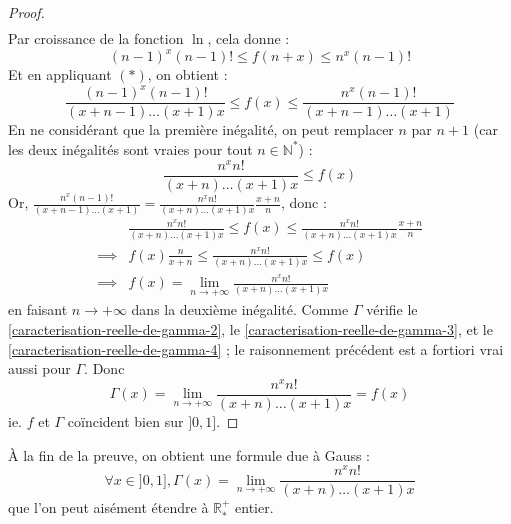 \begin{proof}
\begin{align*}
		\end{align*}
		Par croissance de la fonction $\ln$, cela donne :
		\[ (n-1)^x (n-1)! \leq f(n+x) \leq n^x (n-1)! \]
		Et en appliquant $(*)$, on obtient :
		\[ \frac{(n-1)^x (n-1)!}{(x+n-1) \dots (x+1)x} \leq f(x) \leq \frac{n^x (n-1)!}{(x+n-1) \dots (x+1)} \]
		En ne considérant que la première inégalité, on peut remplacer $n$ par $n+1$ (car les deux inégalités sont vraies pour tout $n \in \mathbb{N}^*$) :
		\[ \frac{n^x n!}{(x+n) \dots (x+1)x} \leq f(x) \]
		Or, $\frac{n^x (n-1)!}{(x+n-1) \dots (x+1)} = \frac{n^x n!}{(x+n) \dots (x+1)x} \frac{x+n}{n}$, donc :
		\begin{align*}
			&\frac{n^x n!}{(x+n) \dots (x+1)x} \leq f(x) \leq \frac{n^x n!}{(x+n) \dots (x+1)x} \frac{x+n}{n} \\
			\implies & f(x) \frac{n}{x+n} \leq \frac{n^x n!}{(x+n) \dots (x+1)x} \leq f(x) \\
			\implies & f(x) = \lim_{n \rightarrow +\infty} \frac{n^x n!}{(x+n) \dots (x+1)x}
		\end{align*}
		en faisant $n \longrightarrow +\infty$ dans la deuxième inégalité. Comme $\Gamma$ vérifie le \cref{caracterisation-reelle-de-gamma-2}, le \cref{caracterisation-reelle-de-gamma-3}, et le \cref{caracterisation-reelle-de-gamma-4} ; le raisonnement précédent est a fortiori vrai aussi pour $\Gamma$. Donc
		\[ \Gamma(x) = \lim_{n \rightarrow +\infty} \frac{n^x n!}{(x+n) \dots (x+1)x} = f(x)  \]
		ie. $f$ et $\Gamma$ coïncident bien sur $]0, 1]$.
	\end{proof}

	\begin{remark}
		À la fin de la preuve, on obtient une formule due à Gauss :
		\[ \forall x \in ]0, 1], \Gamma(x) = \lim_{n \rightarrow +\infty} \frac{n^x n!}{(x+n) \dots (x+1)x} \]
		que l'on peut aisément étendre à $\mathbb{R}^+_*$ entier.
	\end{remark}

